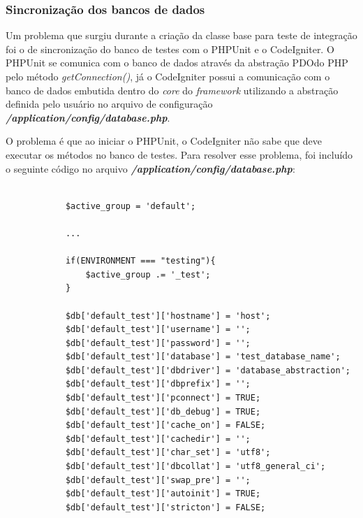 	\subsubsection{Sincronização dos bancos de dados}
	    
	    Um problema que surgiu durante a criação da classe base para teste de integração foi o de sincronização do banco de 
	    testes com o PHPUnit e o CodeIgniter. O PHPUnit se comunica com o banco de dados através da abstração PDO\footnotemark do PHP
	    pelo método \textit{getConnection()}, já o CodeIgniter possui a comunicação com o banco de dados embutida dentro do \textit{core}
	    do \textit{framework} utilizando a abstração definida pelo usuário no arquivo de configuração
	    \textit{\textbf{/application/config/database.php}}. 
	    
	    O problema é que ao iniciar o PHPUnit, o CodeIgniter não sabe que deve executar os métodos no banco de testes.
	    Para resolver esse problema, foi incluído o seguinte código no arquivo \textit{\textbf{/application/config/database.php}}:
	    
	    \begin{lstlisting}
	    
            $active_group = 'default';
            
            ...
	    
            if(ENVIRONMENT === "testing"){
                $active_group .= '_test';
            }
            
            $db['default_test']['hostname'] = 'host';
            $db['default_test']['username'] = '';
            $db['default_test']['password'] = '';
            $db['default_test']['database'] = 'test_database_name';
            $db['default_test']['dbdriver'] = 'database_abstraction';
            $db['default_test']['dbprefix'] = '';
            $db['default_test']['pconnect'] = TRUE;
            $db['default_test']['db_debug'] = TRUE;
            $db['default_test']['cache_on'] = FALSE;
            $db['default_test']['cachedir'] = '';
            $db['default_test']['char_set'] = 'utf8';
            $db['default_test']['dbcollat'] = 'utf8_general_ci';
            $db['default_test']['swap_pre'] = '';
            $db['default_test']['autoinit'] = TRUE;
            $db['default_test']['stricton'] = FALSE;
            
	    \end{lstlisting}

